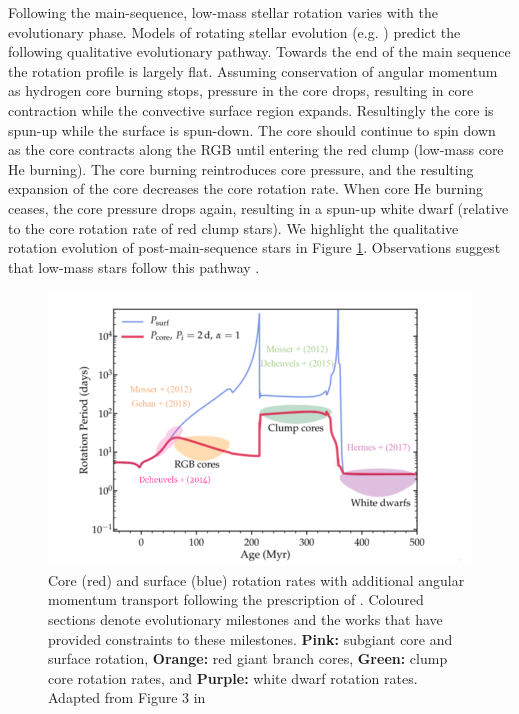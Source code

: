 Following the main-sequence, low-mass stellar rotation varies with the evolutionary phase.
Models of rotating stellar evolution (e.g. )\citep{maeder_evolution_2000,heger_presupernova_2000} predict the following qualitative evolutionary pathway.
Towards the end of the main sequence the rotation profile is largely flat.
Assuming conservation of angular momentum as hydrogen core burning stops, pressure in the core drops, resulting in core contraction while the convective surface region expands.
Resultingly the core is spun-up while the surface is spun-down.
The core should continue to spin down as the core contracts along the RGB until entering the red clump (low-mass core He burning).
The core burning reintroduces core pressure, and the resulting expansion of the core decreases the core rotation rate.
When core He burning ceases, the core pressure drops again, resulting in a spun-up white dwarf (relative to the core rotation rate of red clump stars).
We highlight the qualitative rotation evolution of post-main-sequence stars in Figure \ref{fig:poms_evo}.
Observations suggest that low-mass stars follow this pathway \citep{mosser_spin_2012,deheuvels_seismic_2014,deheuvels_seismic_2015,hermes_white_2017,gehan_core_2018,deheuvels_seismic_2020}.

\begin{figure}[h]
    \includegraphics[width=\textwidth]{Figures/intro_figures/qualitative_evo.png}
    \caption{Core (red) and surface (blue) rotation rates with additional angular momentum transport following the prescription of \citet{spada_angular_2016}. Coloured sections denote evolutionary milestones and the works that have provided constraints to these milestones. \textbf{Pink:} subgiant core and surface rotation, \textbf{Orange:} red giant branch cores, \textbf{Green:} clump core rotation rates, and \textbf{Purple:} white dwarf rotation rates. Adapted from Figure 3 in \citet{fuller_slowing_2019}}
    \label{fig:poms_evo}
\end{figure}


